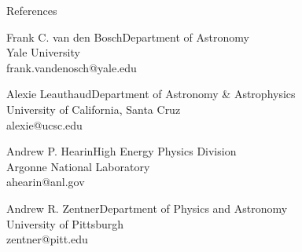 \documentclass{resume}
\begin{document}
\begin{rSection}{References}
  \begin{adjustwidth}{0.5cm}{}

    \begin{rSubsection}{Frank C. van den Bosch}{}{Department of Astronomy\\Yale University\\frank.vandenosch@yale.edu}{}\end{rSubsection}
    
    \begin{rSubsection}{Alexie Leauthaud}{}{Department of Astronomy \& Astrophysics\\University of California, Santa Cruz\\alexie@ucsc.edu}{}\end{rSubsection}
    
    \begin{rSubsection}{Andrew P. Hearin}{}{High Energy Physics Division\\Argonne National Laboratory\\ahearin@anl.gov}{}\end{rSubsection}
    
    \begin{rSubsection}{Andrew R. Zentner}{}{Department of Physics and Astronomy\\University of Pittsburgh\\zentner@pitt.edu}{}\end{rSubsection}

  \end{adjustwidth}
\end{rSection}
\end{document}

